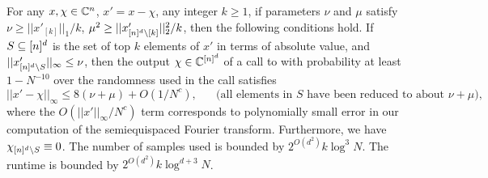 \begin{lemma}\label{lm:linf}
For any $x, \chi\in \mathbb{C}^n$, $x'=x-\chi$, any integer $k\geq 1$, if parameters $\nu$ and $\mu$ satisfy $\nu\geq ||x'_{[k]}||_1/k$, $\mu^2\geq ||x'_{{[n]^d}\setminus [k]}||_2^2/k$, then the following conditions hold. If $S\subseteq {[n]^d}$ is the set of top $k$ elements of $x'$ in terms of absolute value, and $||x'_{{[n]^d}\setminus S}||_\infty\leq \nu$, then the output $\chi\in \mathbb{C}^{[n]^d}$ of a call to   with probability at least $1-N^{-10}$ over the randomness used in the call satisfies
$$
||x'-\chi||_\infty\leq 8(\nu+\mu)+O(1/N^c), \text{~~~~~(all elements in $S$ have been reduced to about $\nu+\mu$)},
$$
where the $O(||x'||_\infty/N^c)$ term corresponds to polynomially small error in our computation of the semiequispaced Fourier transform. Furthermore, we have $\chi_{{[n]^d}\setminus S}\equiv 0$.
The number of samples used is bounded by $2^{O(d^2)} k\log^3 N$. The runtime is bounded by $2^{O(d^2)} k \log^{d+3} N$.
\end{lemma}
